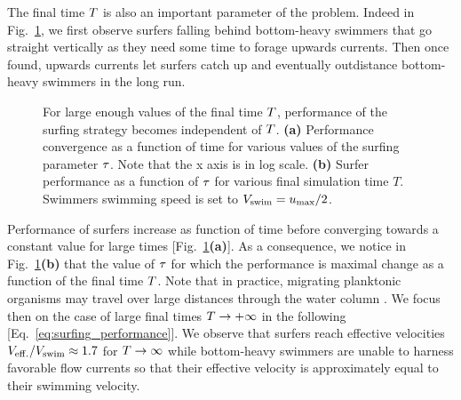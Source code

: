 The final time $\FinalTime$ is also an important parameter of the problem. 
Indeed in Fig.~\ref{fig:taylor_green_vortex_time_performance_tau_and_tau_performance_final_time}, we first observe surfers falling behind bottom-heavy swimmers that go straight vertically as they need some time to forage upwards currents.
Then once found, upwards currents let surfers catch up and eventually outdistance bottom-heavy swimmers in the long run.
\begin{figure}%
	\centering
	
	\caption[For large enough values of the final time $\FinalTime$, performance of the surfing strategy becomes independent of $\FinalTime$.]{
		For large enough values of the final time $\FinalTime$, performance of the surfing strategy becomes independent of $\FinalTime$.
		\textbf{(a)} Performance convergence as a function of time for various values of the surfing parameter $\tau$.
		Note that the x axis is in log scale.
		\textbf{(b)} Surfer performance as a function of $\tau$ for various final simulation time $T$.
		Swimmers swimming speed is set to $V_{\mathrm{swim}} = u_{\mathrm{max}}/2$.
	}
	\label{fig:taylor_green_vortex_time_performance_tau_and_tau_performance_final_time}
\end{figure}
Performance of surfers increase as function of time before converging towards a constant value for large times [Fig.~\ref{fig:taylor_green_vortex_time_performance_tau_and_tau_performance_final_time}\textbf{(a)}].
As a consequence, we notice in Fig.~\ref{fig:taylor_green_vortex_time_performance_tau_and_tau_performance_final_time}\textbf{(b)} that the value of $\tau$ for which the performance is maximal change as a function of the final time $\FinalTime$.
Note that in practice, migrating planktonic organisms may travel over large distances through the water column \citep{hardy1954experimental, williamson2011toward, prairie2012biophysical}.
We focus then on the case of large final times $T \to +\infty$ in the following [Eq.~\eqref{eq:surfing_performance}].
We observe that surfers reach effective velocities $V_{\mathrm{eff.}}/V_{\mathrm{swim}} \approx 1.7$ for $T \to \infty$ while bottom-heavy swimmers are unable to harness favorable flow currents so that their effective velocity is approximately equal to their swimming velocity.

